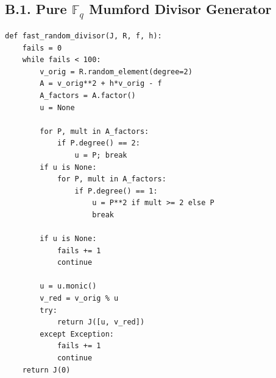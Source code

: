 \documentclass[letterpaper, 11pt]{article}
\begin{document}
\subsection{B.1. Pure \texorpdfstring{$\mathbb{F}_q$}{F\_q} Mumford Divisor Generator}
\begin{lstlisting}
def fast_random_divisor(J, R, f, h):
    fails = 0
    while fails < 100:
        v_orig = R.random_element(degree=2)
        A = v_orig**2 + h*v_orig - f
        A_factors = A.factor()
        u = None
        
        for P, mult in A_factors:
            if P.degree() == 2:
                u = P; break
        if u is None:
            for P, mult in A_factors:
                if P.degree() == 1:
                    u = P**2 if mult >= 2 else P
                    break
                    
        if u is None:
            fails += 1
            continue
            
        u = u.monic()
        v_red = v_orig % u
        try:
            return J([u, v_red])
        except Exception:
            fails += 1
            continue
    return J(0) 
\end{lstlisting}
\end{document}
